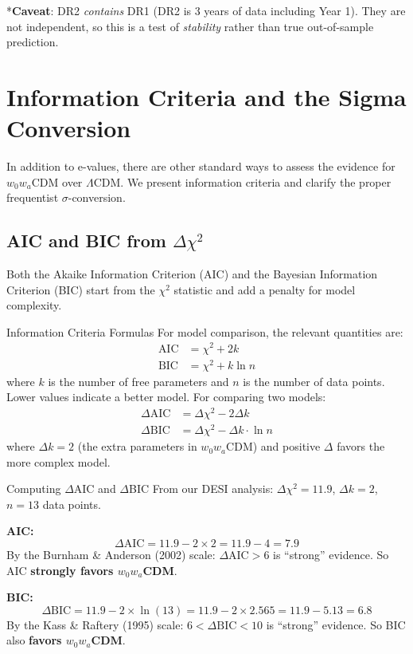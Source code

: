 \documentclass[11pt,a4paper]{article}
\newcommand{\LCDM}{$\Lambda$CDM}
\begin{document}
*\textbf{Caveat}: DR2 \textit{contains} DR1 (DR2 is 3 years of data including Year 1). They are not independent, so this is a test of \textit{stability} rather than true out-of-sample prediction.


\section{Information Criteria and the Sigma Conversion}
\label{sec:info_criteria}

In addition to e-values, there are other standard ways to assess the evidence for $w_0w_a$CDM over \LCDM. We present information criteria and clarify the proper frequentist $\sigma$-conversion.

\subsection{AIC and BIC from $\Delta\chi^2$}

Both the Akaike Information Criterion (AIC) and the Bayesian Information Criterion (BIC) start from the $\chi^2$ statistic and add a penalty for model complexity.

\begin{conceptbox}{Information Criteria Formulas}
For model comparison, the relevant quantities are:
\begin{align}
\text{AIC} &= \chi^2 + 2k \\
\text{BIC} &= \chi^2 + k \ln n
\end{align}
where $k$ is the number of free parameters and $n$ is the number of data points. Lower values indicate a better model. For comparing two models:
\begin{align}
\Delta\text{AIC} &= \Delta\chi^2 - 2\Delta k \\
\Delta\text{BIC} &= \Delta\chi^2 - \Delta k \cdot \ln n
\end{align}
where $\Delta k = 2$ (the extra parameters in $w_0w_a$CDM) and positive $\Delta$ favors the more complex model.
\end{conceptbox}

\begin{examplebox}{Computing $\Delta$AIC and $\Delta$BIC}
From our DESI analysis: $\Delta\chi^2 = 11.9$, $\Delta k = 2$, $n = 13$ data points.

\textbf{AIC:}
\begin{equation}
\Delta\text{AIC} = 11.9 - 2 \times 2 = 11.9 - 4 = 7.9
\end{equation}
By the Burnham \& Anderson (2002) scale: $\Delta\text{AIC} > 6$ is ``strong'' evidence. So AIC \textbf{strongly favors $w_0w_a$CDM}.

\textbf{BIC:}
\begin{equation}
\Delta\text{BIC} = 11.9 - 2 \times \ln(13) = 11.9 - 2 \times 2.565 = 11.9 - 5.13 = 6.8
\end{equation}
By the Kass \& Raftery (1995) scale: $6 < \Delta\text{BIC} < 10$ is ``strong'' evidence. So BIC also \textbf{favors $w_0w_a$CDM}.
\end{examplebox}
\end{document}
